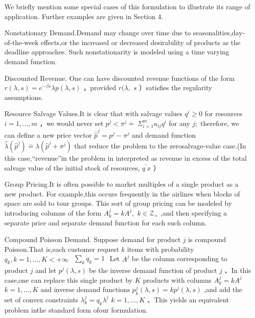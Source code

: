 We briefly mention some special cases of this formulation to illustrate
its range of application. Further examples are given in Section 4.

Nonstationary Demand.Demand may change over time due to
seasonalities,day-of-the-week effects,or the increased or decreased
desirability of products as the deadline approaches. Such
nonstationarity is modeled using a time varying demand function.

Discounted Revenue. One can have discounted revenue functions of the
form \(r ( \lambda , s ) = e ^ { - \beta s } \lambda p ( \lambda , s )\)
，provided \(r ( \lambda ,\) \(s \dot { }\) ）satisfies the regularity
assumptions.

Resource Salvage Values.It is clear that with salvage values
\(q ^ { i } \geqslant 0\) for resources \(i = 1 , \ldots , m\) ，we
would never set
\(p ^ { j } < \pi ^ { j } \doteq \ \Sigma _ { i = 1 } ^ { m } a _ { i j } q ^ { i }\)
for any \(j ;\) therefore, we can define a new price vector
\(\bar { \hat { p } } ^ { j } = p ^ { j } - \pi ^ { j }\) and demand
function
\(\hat { \lambda } ( \hat { p } ^ { j } ) \stackrel { - } { = } \lambda ( \hat { p } ^ { j } + \pi ^ { j } )\)
that reduce the problem to the zerosalvage-value case.(In this
case,``revenue''in the problem in interpreted as revenue in excess of
the total salvage value of the initial stock of resources,
\(q ^ { \prime } x\) ）

Group Pricing.It is often possible to market multiples of a single
product as a new product. For example,this occurs frequently in the
airlines when blocks of space are sold to tour groups. This sort of
group pricing can be modeled by introducing columns of the form
\(A _ { k } ^ { j } = k A ^ { j } ,\) \(k \in \mathcal { Z } _ { + }\)
,and then specifying a separate price and separate demand function for
each such column.

Compound Poisson Demand. Suppose demand for product \(j\) is compound
Poisson.That is,each customer request \(k\) items with probability
\(q _ { k } , k = 1 , \ldots , K < + \infty\)
\(\begin{array} { r } { \sum _ { k } q _ { k } = 1 } \end{array}\) Let
\(A ^ { j }\) be the column corresponding to product \(j\) and let
\(p ^ { j } ( \lambda , s )\) be the inverse demand function of product
\(j\) 、In this case,one can replace this single product by \(K\)
products with columns \(A _ { k } ^ { j } = k A ^ { j }\)
\(k = 1 , \dots , K\) and inverse demand functions
\(p _ { k } ^ { j } ( \lambda , s ) = k p ^ { j } ( \lambda , s )\) ,and
add the set of convex constraints
\(\lambda _ { k } ^ { j } = q _ { k } \lambda ^ { j }\)
\(k = 1 , \ldots , K\) 、This yields an equivalent problem inthe
standard form ofour formulation.

